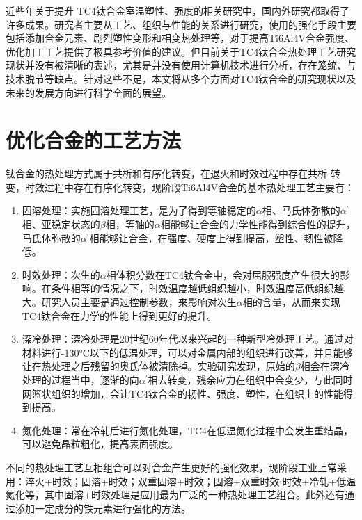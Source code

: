 \documentclass[
class = book,
zihao = -4,
font = noto,
paper = a4paper,
openany
]{easybook}
\newcommand{\ti}{Ti6Al4V}
\begin{document}
近些年关于提升 TC4钛合金室温塑性、强度的相关研究中，国内外研究都取得了许多成果。研究者主要从工艺、组织与性能的关系进行研究，使用的强化手段主要包括添加合金元素、剧烈塑性变形和相变热处理等，对于提高\ti 合金强度、优化加工工艺提供了极具参考价值的建议。但目前关于TC4钛合金热处理工艺研究现状并没有被清晰的表述，尤其是并没有使用计算机技术进行分析，存在笼统、与技术脱节等缺点。针对这些不足，本文将从多个方面对TC4钛合金的研究现状以及未来的发展方向进行科学全面的展望。

\section{优化合金的工艺方法}
钛合金的热处理方式属于共析和有序化转变，在退火和时效过程中存在共析 转变，时效过程中存在有序化转变，现阶段\ti 合金的基本热处理工艺主要有：
\begin{enumerate}
	\item 固溶处理：实施固溶处理工艺，是为了得到等轴稳定的$\alpha $相、马氏体弥散的$ \alpha ^{\prime} $相、亚稳定状态的$\beta $相，等轴的$\alpha $相能够让合金的力学性能得到综合性的提升，马氏体弥散的$ \alpha ^{\prime} $相能够让合金，在强度、硬度上得到提高，塑性、韧性被降低\cite{gurong2002}。
	\item 时效处理：次生的$\alpha $相体积分数在TC4钛合金中，会对屈服强度产生很大的影响。在条件相等的情况之下，时效温度越低组织越小，时效温度高低组织越大。研究人员主要是通过控制参数，来影响对次生$\alpha $相的含量，从而来实现TC4钛合金在力学的性能上得到更好的提升。
	\item 深冷处理：深冷处理是20世纪60年代以来兴起的一种新型冷处理工艺。通过对材料进行-130°C以下的低温处理，可以对金属内部的组织进行改善，并且能够让在热处理之后残留的奥氏体被清除掉。实验研究发现，原始的$\beta $相会在深冷处理的过程当中，逐渐的向$\alpha^{\prime} $相去转变，残余应力在组织中会变少，与此同时网篮状组织的增加，会让TC4钛合金的韧性、强度、塑性，在组织上的性能得到提高。
	\item 氮化处理：常在冷轧后进行氮化处理，TC4在低温氮化过程中会发生重结晶，可以避免晶粒粗化，提高表面强度\cite{guotanliuMicrostructureEvolutionTi2022}。
\end{enumerate}
不同的热处理工艺互相组合可以对合金产生更好的强化效果，现阶段工业上常采用\cite{zhoukaixiangJiyushenlengchulidenanjiagongcailiaoqiexiaotexingyanjiu2022}：淬火+时效；固溶+时效；双重固溶+时效；固溶+双重时效;时效+冷轧+低温氮化等，其中固溶+时效处理是应用最为广泛的一种热处理工艺组合。此外还有通过添加一定成分的铁元素进行强化的方法\cite{yuliaoMicrostructuralStrengtheningToughening2022}。
\end{document}
